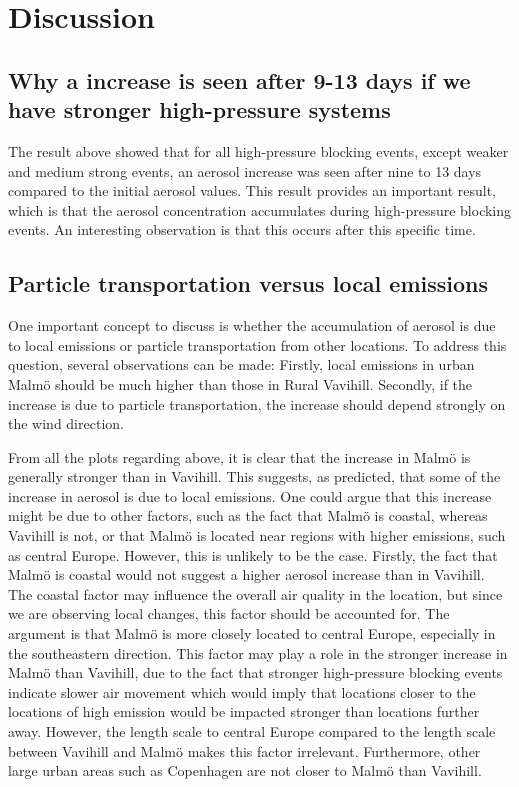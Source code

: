 \newpage
\section{Discussion}
\subsection{Why a increase is seen after 9-13 days if we have stronger high-pressure systems}
The result above showed that for all high-pressure blocking events, except weaker and medium strong events, an aerosol increase was seen after nine to 13 days compared to the initial aerosol values. This result provides an important result, which is that the aerosol concentration accumulates during high-pressure blocking events. An interesting observation is that this occurs after this specific time. 

\subsection{Particle transportation versus local emissions}
One important concept to discuss is whether the accumulation of aerosol is due to local emissions or particle transportation from other locations. To address this question, several observations can be made: Firstly, local emissions in urban Malmö should be much higher than those in Rural Vavihill. Secondly, if the increase is due to particle transportation, the increase should depend strongly on the wind direction. 

From all the plots regarding \PM above, it is clear that the increase in Malmö is generally stronger than in Vavihill. This suggests, as predicted, that some of the increase in aerosol is due to local emissions. One could argue that this increase might be due to other factors, such as the fact that Malmö is coastal, whereas Vavihill is not, or that Malmö is located near regions with higher emissions, such as central Europe. However, this is unlikely to be the case. Firstly, the fact that Malmö is coastal would not suggest a higher aerosol increase than in Vavihill. The coastal factor may influence the overall air quality in the location, but since we are observing local changes, this factor should be accounted for. The argument is that Malmö is more closely located to central Europe, especially in the southeastern direction. This factor may play a role in the stronger increase in Malmö than Vavihill, due to the fact that stronger high-pressure blocking events indicate slower air movement which would imply  that locations closer to the locations of high emission would be impacted stronger than locations further away. However, the length scale to central Europe compared to the length scale between Vavihill and Malmö makes this factor irrelevant. Furthermore, other large urban areas such as Copenhagen are not closer to Malmö than Vavihill. 

